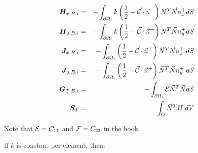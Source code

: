 \begin{footnotesize}
\begin{eqnarray}
{\bm H}_{x,B,i} &=&     -\int_{\partial\Omega_i} k \left( \frac{1}{2} - \vec{\cal C} \cdot \vec{n}^+ \right) {N}^T \vec{N} n^+_x dS \\
{\bm H}_{y,B,i} &=&     -\int_{\partial\Omega_i} k \left( \frac{1}{2} - \vec{\cal C} \cdot \vec{n}^+ \right) {N}^T \vec{N} n^+_y dS \\
{\bm J}_{x,B,i} &=&     -\int_{\partial\Omega_i} \left(\frac{1}{2} + \vec{\cal{C}} \cdot \vec{n}^+ \right) \vec{N}^T \vec{N} {n}_x^+    \; dS \\
{\bm J}_{y,B,i} &=&     -\int_{\partial\Omega_i} \left(\frac{1}{2} + \vec{\cal{C}} \cdot \vec{n}^+ \right) \vec{N}^T \vec{N} {n}_y^+    \; dS \\
{\bm G}_{T,B,i} &=&   -\int_{\partial\Omega_i}   {\cal{E}}   \vec{N}^T \vec{N} dS  \\
{\bm S}_{T} &=&        \int_{\Omega} \vec{N}^T H  \;dV  
\end{eqnarray}
\end{footnotesize}

Note that ${\cal E}=C_{11}$ and ${\cal F}=C_{22}$ in the book.


\newpage
If $k$ is constant per element, then:

